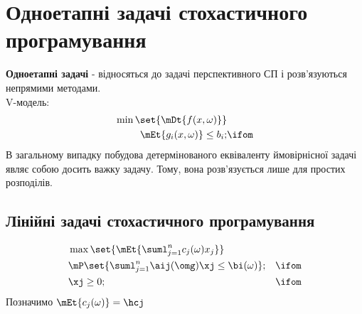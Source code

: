 \section{Одноетапні задачі стохастичного програмування}
{\bf Одноетапні задачі} - відносяться до задачі перспективного СП і розв’язуються непрямими методами.\\
V-модель:
\begin{eqnarray}
\min\set{\mDt{f(x,\omega)}}&\\
\mEt{g_i(x,\omega)} \leq b_i;&\ifom
\end{eqnarray}
В загальному випадку побудова детермінованого еквіваленту ймовірнісної задачі являє собою досить важку задачу. Тому, вона розв’язується лише для простих розподілів.
\subsection{Лінійні задачі стохастичного програмування}
\begin{eqnarray}
&\max\set{\mEt{\suml_{j=1}^n c_j(\omega)x_j}} \\
&\mP\set{\suml_{j=1}^n \aij(\omg)\xj\leq \bi(\omega)};&\ifom \\
&\xj \geq 0;&\ifom
\end{eqnarray}
Позначимо $\mEt{c_j(\omega)} = \hcj$\\

